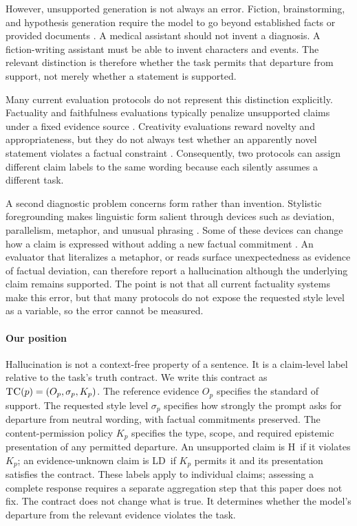 \documentclass{clv2025}
\newcommand{\TC}{\textsc{TC}}
\newcommand{\LD}{\textsc{LD}}
\newcommand{\Hall}{\textsc{H}}
\begin{document}
However, unsupported generation is not always an error.
Fiction, brainstorming, and hypothesis generation require the model to go beyond established facts or provided documents \citep{franceschelli_creativity_2024,jiang_survey_2024,sui_confabulation_2024}.
A medical assistant should not invent a diagnosis.
A fiction-writing assistant must be able to invent characters and events.
The relevant distinction is therefore whether the task permits that departure from support, not merely whether a statement is supported.

Many current evaluation protocols do not represent this distinction explicitly.
Factuality and faithfulness evaluations typically penalize unsupported claims under a fixed evidence source \citep{maynez_faithfulness_2020,bang_hallulens_2025}.
Creativity evaluations reward novelty and appropriateness, but they do not always test whether an apparently novel statement violates a factual constraint \citep{acar_creativity_2019,hou_creativityprism_2025}.
Consequently, two protocols can assign different claim labels to the same wording because each silently assumes a different task.

A second diagnostic problem concerns form rather than invention.
Stylistic foregrounding makes linguistic form salient through devices such as deviation, parallelism, metaphor, and unusual phrasing \citep{leech_short_style_1981,vanpeer_stylistics_2020}.
Some of these devices can change how a claim is expressed without adding a new factual commitment \citep{badathala_match_2023,jin_deep_2022}.
An evaluator that literalizes a metaphor, or reads surface unexpectedness as evidence of factual deviation, can therefore report a hallucination although the underlying claim remains supported.
The point is not that all current factuality systems make this error, but that many protocols do not expose the requested style level as a variable, so the error cannot be measured.

\paragraph{Our position}
Hallucination is not a context-free property of a sentence.
It is a claim-level label relative to the task's truth contract.
We write this contract as $\TC(p)=(O_p,\sigma_p,K_p)$.
The reference evidence $O_p$ specifies the standard of support.
The requested style level $\sigma_p$ specifies how strongly the prompt asks for departure from neutral wording, with factual commitments preserved.
The content-permission policy $K_p$ specifies the type, scope, and required epistemic presentation of any permitted departure.
An unsupported claim is \Hall\ if it violates $K_p$; an evidence-unknown claim is \LD\ if $K_p$ permits it and its presentation satisfies the contract.
These labels apply to individual claims; assessing a complete response requires a separate aggregation step that this paper does not fix.
The contract does not change what is true.
It determines whether the model's departure from the relevant evidence violates the task.
\end{document}
